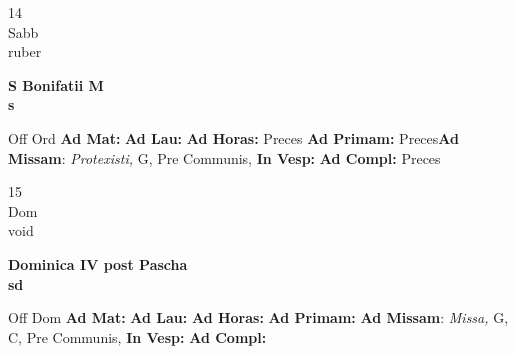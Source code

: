 \documentclass[10pt, openany]{book}
\begin{document}
    \begin{center}
        \begin{minipage}{3.5in}
            \vspace{2em}
            \begin{minipage}{0.5in}
                {\Huge 14} \\
                {\normalsize Sabb} \\
                {\normalsize ruber}
            \end{minipage}
            \begin{minipage}{3.0in}
                \textbf{ \large S Bonifatii M \\
                \textnormal{\normalsize s}} \\ 
            \end{minipage}
            \begin{justify}Off Ord
                \textbf{Ad Mat: }
                \textbf{Ad Lau: }
                \textbf{Ad Horas: }Preces
                \textbf{Ad Primam: }Preces\textbf{Ad Missam}: \textit{Protexisti,} G, Pre Communis,  
                \textbf{In Vesp: }
                \textbf{Ad Compl: }Preces
            \end{justify}
        \end{minipage}
    \end{center}

    \begin{center}
        \begin{minipage}{3.5in}
            \vspace{2em}
            \begin{minipage}{0.5in}
                {\Huge 15} \\
                {\normalsize Dom} \\
                {\normalsize void}
            \end{minipage}
            \begin{minipage}{3.0in}
                \textbf{ \large Dominica IV post Pascha \\
                \textnormal{\normalsize sd}} \\ 
            \end{minipage}
            \begin{justify}Off Dom
                \textbf{Ad Mat: }
                \textbf{Ad Lau: }
                \textbf{Ad Horas: }
                \textbf{Ad Primam: }\textbf{Ad Missam}: \textit{Missa,} G, C, Pre Communis,  
                \textbf{In Vesp: }
                \textbf{Ad Compl: }
            \end{justify}
        \end{minipage}
    \end{center}
\end{document}
